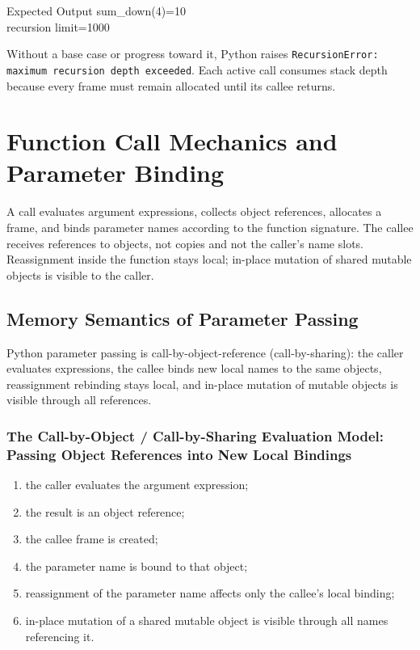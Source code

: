\documentclass[a4paper,twoside]{report}
\begin{document}
\begin{iobox}{Expected Output}
sum\_down(4)=10 \\
recursion limit=1000 \\
\end{iobox}




Without a base case or progress toward it, Python raises \texttt{RecursionError: maximum recursion depth exceeded}. Each active call consumes stack depth because every frame must remain allocated until its callee returns.


\section{Function Call Mechanics and Parameter Binding}

A call evaluates argument expressions, collects object references, allocates a frame, and binds parameter names according to the function signature. The callee receives references to objects, not copies and not the caller's name slots. Reassignment inside the function stays local; in-place mutation of shared mutable objects is visible to the caller.


\subsection{Memory Semantics of Parameter Passing}

Python parameter passing is call-by-object-reference (call-by-sharing): the caller evaluates expressions, the callee binds new local names to the same objects, reassignment rebinding stays local, and in-place mutation of mutable objects is visible through all references.

\subsubsection{The Call-by-Object / Call-by-Sharing Evaluation Model: Passing Object References into New Local Bindings}

\begin{enumerate}
    \item the caller evaluates the argument expression;
    \item the result is an object reference;
    \item the callee frame is created;
    \item the parameter name is bound to that object;
    \item reassignment of the parameter name affects only the callee's local binding;
    \item in-place mutation of a shared mutable object is visible through all names referencing it.
\end{enumerate}
\end{document}
